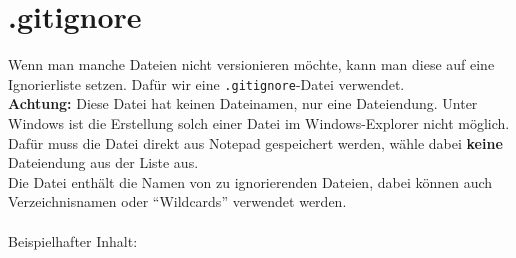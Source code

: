 \documentclass[accentcolor=tud8b,colorbacktitle,12pt]{tudexercise}
\begin{document}
\section*{.gitignore}
Wenn man manche Dateien nicht versionieren möchte, kann man diese auf eine Ignorierliste setzen. Dafür wir eine \lstinline|.gitignore|-Datei verwendet.\\
\textbf{Achtung:} Diese Datei hat keinen Dateinamen, nur eine Dateiendung. Unter Windows ist die Erstellung solch einer Datei im Windows-Explorer nicht möglich. Dafür muss die Datei direkt aus Notepad gespeichert werden, wähle dabei \textbf{keine} Dateiendung aus der Liste aus.\\
Die Datei enthält die Namen von zu ignorierenden Dateien, dabei können auch Verzeichnisnamen oder "`Wildcards"' verwendet werden.\\
\\
Beispielhafter Inhalt:

\end{document}
